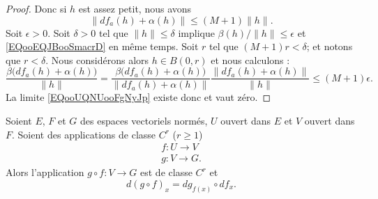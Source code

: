 \begin{proof}
    Donc si \( h\) est assez petit, nous avons
    \begin{equation}        \label{EQooEQJBooSmacrD}
        \| df_a(h)+\alpha(h) \|\leq (M+1)\| h \|.
    \end{equation}
    Soit \( \epsilon>0\). Soit \( \delta>0\) tel que \( \| h \|\leq \delta\) implique \( \beta(h)/\| h \|\leq \epsilon\) et \eqref{EQooEQJBooSmacrD} en même temps. Soit \( r\) tel que \( (M+1)r<\delta\); et notons que \( r<\delta\). Nous considérons alors \( h\in B(0,r)\) et nous calculons :
    \begin{equation}
        \frac{ \beta\big( df_a(h)+\alpha(h) \big) }{ \| h \| }=\frac{ \beta\big( df_a(h)+\alpha(h) \big) }{ \| df_a(h)+\alpha(h) \| }\frac{ \| df_a(h)+\alpha(h) \| }{ \| h \| }\leq (M+1)\epsilon.
    \end{equation}
    La limite \eqref{EQooUQNUooFgNyJp} existe donc et vaut zéro.
\end{proof}

\begin{theorem}    \label{ThoAGXGuEt}
    Soient \( E\), \( F\) et \( G\) des espaces vectoriels normés, \( U\) ouvert dans \( E\) et \( V\) ouvert dans \( F\). Soient des applications de classe \( C^r\) (\( r\geq 1\))
    \begin{subequations}
        \begin{align}
            f\colon U\to V\\
            g\colon V\to G.
        \end{align}
    \end{subequations}
    Alors l'application \( g\circ f\colon V\to G\) est de classe \( C^r\) et
    \begin{equation}\label{EqHFmezmr}
        d(g\circ f)_x=dg_{f(x)}\circ df_x.
    \end{equation}
\end{theorem}

